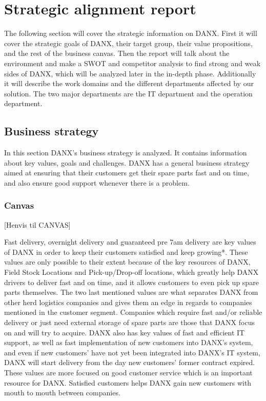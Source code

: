 \chapter{Strategic alignment report}
The following section will cover the strategic information on DANX. First it will cover the strategic goals of DANX, their target group, their value propositions, and the rest of the business canvas. 
Then the report will talk about the environment and make a SWOT and competitor analysis to find strong and weak sides of DANX, which will be analyzed later in the in-depth phase.
Additionally it will describe the work domains and the different departments affected by our solution. The two major departments are the IT department and the operation department.

\section*{Business strategy}
In this section DANX’s business strategy is analyzed. It contains information about key values, goals and challenges.
DANX has a general business strategy aimed at ensuring that their customers get their spare parts fast and on time, and also ensure good support whenever there is a problem.

\subsection{Canvas}

[Henvis til CANVAS]

Fast delivery, overnight delivery and guaranteed pre 7am delivery are key values of DANX in order to keep their customers satisfied and keep growing*. These values are only possible to their extent because of the key resources of DANX, Field Stock Locations and Pick-up/Drop-off locations, which greatly help DANX drivers to deliver fast and on time, and it allows customers to even pick up spare parts themselves. The two last mentioned values are what separates DANX from other herd logistics companies and gives them an edge in regards to companies mentioned in the customer segment. Companies which require fast and/or reliable delivery or just need external storage of spare parts are those that DANX focus on and will try to acquire.
DANX also has key values of fast and efficient IT support, as well as fast implementation of new customers into DANX's system, and even if new customers' have not yet been integrated into DANX's IT system, DANX will start delivery from the day new customers' former contract expired. These values are more focused on good customer service which is an important resource for DANX. Satisfied customers helps DANX gain new customers with mouth to mouth between companies.

